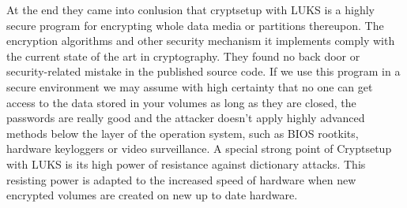 At the end they came into conlusion that cryptsetup with LUKS is a highly secure program for encrypting whole data media or partitions thereupon.
The encryption algorithms and other security mechanism it implements comply with the current state of the art in cryptography.
They found no back door or security-related mistake in the published source code.
If we use this program in a secure environment we may assume with high certainty that no one can get access to the data stored in your volumes as long as they are closed, the passwords are really good and the attacker doesn't apply highly advanced methods below the layer of the operation system, such as BIOS rootkits, hardware keyloggers or video surveillance.
A special strong point of Cryptsetup with LUKS is its high power of resistance against dictionary attacks.
This resisting power is adapted to the increased speed of hardware when new encrypted volumes are created on new up to date hardware\cite{team2012security}.
